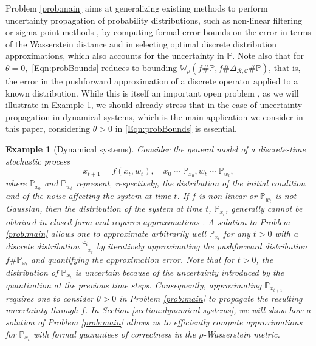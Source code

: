 \documentclass[11pt, a4paper, oneside,reqno]{amsart}
\theoremstyle{plain}
\newtheorem{example}{Example}
\def\prob{\mathbb{P}}
\def\wasserstein{{\mathbb{W}}}
\def\bsR{{\bm{\mathcal{R}}}}
\def\bsC{{\bm{\mathcal{C}}}}
\begin{document}
Problem \ref{prob:main} aims at 
generalizing existing methods to perform uncertainty propagation of probability distributions, such as non-linear filtering \cite{bucy1971digital, alspach1972nonlinear} or sigma point methods \cite{julier2004unscented}, by computing formal error bounds on the error in terms of the Wasserstein distance and in selecting optimal discrete distribution approximations, which also accounts for the uncertainty in $\prob$. %
Note also that for $\theta=0,$ \eqref{Eqn:probBounds} reduces to bounding $\wasserstein_{\rho}(f \# \prob, f \# \Delta_{\bsR, \bsC} \# \prob)$, that is, the error in the pushforward approximation of a discrete operator applied to a known distribution. While this is itself an important open problem \cite{landgraf2023probabilistic}, as we will illustrate in Example \ref{example:initial}, we should already stress that in the case of uncertainty propagation in dynamical systems, which is the main application we consider in this paper, considering $\theta>0$ in \eqref{Eqn:probBounds} is essential.  

\begin{example}[Dynamical systems]
\label{example:initial}
 Consider the general model of a discrete-time stochastic process
\begin{equation*}\label{eq:examples}
    x_{t+1} = f(x_t,w_t), \quad x_0 \sim \prob_{x_0}, w_t \sim \prob_{w_t},
\end{equation*}
where $\prob_{x_0}$ and $\prob_{w_t}$ represent, respectively, the distribution of the initial condition and of the noise affecting the system at time $t$. 
If $f$ is non-linear or $\prob_{w_t}$ is not Gaussian, then the distribution of the system at time $t$, $\prob_{x_t}$, generally cannot be obtained in closed form and requires approximations \cite{girard2002gaussian, landgraf2023probabilistic,figueiredo2024uncertainty}. A solution to Problem \ref{prob:main} allows one to approximate arbitrarily well
$\prob_{x_t}$ for any $t>0$ with a discrete distribution $\hat{\prob}_{x_t}$ by iteratively approximating the pushforward distribution $f \# {\prob}_{x_t}$ and quantifying the approximation error. {Note that for $t>0$, the distribution of $\prob_{x_{t}}$ is uncertain because of the uncertainty introduced by the quantization at the previous time steps. Consequently, approximating $\prob_{x_{t+1}}$ requires one to consider $\theta>0$ in Problem \ref{prob:main} to propagate the resulting uncertainty through $f$}. In Section \ref{section:dynamical-systems}, we will show how a solution of Problem \ref{prob:main} allows us to efficiently compute approximations for $\prob_{x_{t}}$ with formal guarantees of correctness in the $\rho$-Wasserstein metric.
\end{example}
\end{document}
